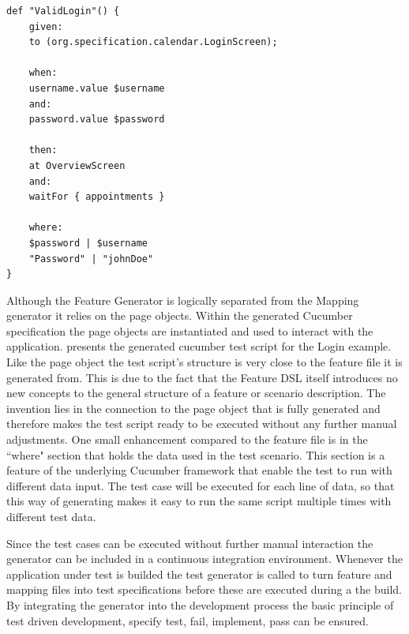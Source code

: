 \documentclass{sig-alternate-05-2015}
\begin{document}
\begin{lstlisting}[captionpos=b, caption=Generated Feature File, label={lst:featureGenerated}, language=dsl]
	def "ValidLogin"() {
	given:
	to (org.specification.calendar.LoginScreen);
	
	when:
	username.value $username
	and:
	password.value $password
	
	then:
	at OverviewScreen
	and:
	waitFor { appointments }
	
	where:
	$password | $username
	"Password" | "johnDoe"
}
\end{lstlisting}
Although the Feature Generator is logically separated from the Mapping generator it relies on the page objects.
Within the generated Cucumber specification the page objects are instantiated and used to interact with the application.
 presents the generated cucumber test script for the Login example. 
Like the page object the test script's structure is very close to the feature file it is generated from.
This is due to the fact that the Feature DSL itself introduces no new concepts to the general structure of a feature or scenario description.
The invention lies in the connection to the page object that is fully generated and therefore makes the test script ready to be executed without any further manual adjustments.
One small enhancement compared to the feature file is in the ``where" section that holds the data used in the test scenario.
This section is a feature of the underlying Cucumber framework that enable the test to run with different data input. 
The test case will be executed for each line of data, so that this way of generating makes it easy to run the same script multiple times with different test data.

Since the test cases can be executed without further manual interaction the generator can be included in a continuous integration environment.
Whenever the application under test is builded the test generator is called to turn feature and mapping files into test specifications before these are executed during a the build.
By integrating the generator into the development process the basic principle of test driven development, specify test, fail, implement, pass can be ensured.
\end{document}
